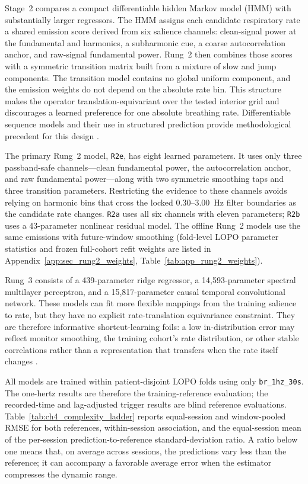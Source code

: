 Stage~2 compares a compact differentiable hidden Markov model (HMM) with substantially larger
regressors. The HMM assigns each candidate respiratory rate a shared emission score derived from
six salience channels: clean-signal power at the fundamental and harmonics, a subharmonic cue, a
coarse autocorrelation anchor, and raw-signal fundamental power. Rung~2 then combines those
scores with a symmetric transition matrix built from a mixture of slow and jump components.
The transition model contains no global uniform component, and the emission weights do not
depend on the absolute rate bin. This structure makes the operator translation-equivariant over
the tested interior grid and discourages a learned preference for one absolute breathing rate.
Differentiable sequence models and their use in structured prediction provide methodological
precedent for this design \citep{mensch2018differentiable,riou2023pesto}.

The primary Rung~2 model, \texttt{R2e}, has eight learned parameters. It uses only three
passband-safe channels---clean fundamental power, the autocorrelation anchor, and raw
fundamental power---along with two symmetric smoothing taps and three transition parameters.
Restricting the evidence to these channels avoids relying on harmonic bins that cross the
locked $0.30$--$3.00$~Hz filter boundaries as the candidate rate changes. \texttt{R2a} uses all
six channels with eleven parameters; \texttt{R2b} uses a 43-parameter nonlinear residual model.
The offline Rung~2 models use the same emissions with future-window smoothing (fold-level LOPO parameter statistics and frozen full-cohort refit weights are listed in Appendix~\ref{app:sec_rung2_weights}, Table~\ref{tab:app_rung2_weights}).

Rung~3 consists of a 439-parameter ridge regressor, a 14,593-parameter spectral multilayer
perceptron, and a 15,817-parameter causal temporal convolutional network. These models can fit
more flexible mappings from the training salience to rate, but they have no explicit
rate-translation equivariance constraint. They are therefore informative shortcut-learning
foils: a low in-distribution error may reflect monitor smoothing, the training cohort's rate
distribution, or other stable correlations rather than a representation that transfers when the
rate itself changes \citep{geirhos2020shortcut}.

All models are trained within patient-disjoint LOPO folds using only \texttt{br\_1hz\_30s}. The
one-hertz results are therefore the training-reference evaluation; the recorded-time and
lag-adjusted trigger results are blind reference evaluations. Table~\ref{tab:ch4_complexity_ladder} reports equal-session and
window-pooled RMSE for both references, within-session association, and the equal-session mean
of the per-session prediction-to-reference standard-deviation ratio. A ratio below one means
that, on average across sessions, the predictions vary less than the reference; it can
accompany a favorable average error when the estimator compresses the dynamic range.

